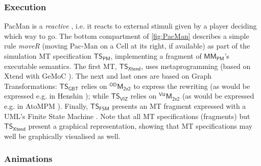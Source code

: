\subsubsection{Execution}
\label{sec:Examples:PacMan:Execution}

PacMan is a \emph{reactive} \DSL, i.e. it reacts to external stimuli given by a 
player deciding which way to go. 
The bottom compartment of \autoref{fig:PacMan} describes a simple rule 
\emph{\textsf{moveR}} (moving Pac-Man on a \textsf{Cell} at its right, if 
available) as part of the simulation MT specification $\mathsf{TS}_{\mathsf{PM}}$,
implementing a fragment of $\mathsf{MM}_{\mathsf{PM}}$'s executable semantics. 
The first MT, $\mathsf{TS}_{\mathsf{Xtend}}$, uses metaprogramming 
(based on Xtend with GeMoC \cite{Leroy-Bousse-etAl:2017}). The next and last ones
are based on Graph Transformations: $\mathsf{TS}_{\mathsf{GBT}}$ relies on 
$^{\mathsf{OD}}\mathsf{M}_{\mathsf{2x2}}$ to express the rewriting (as would be 
expressed e.g. in Henshin \cite{Bill-Gabmeyer-Kaufmann-Seidl:2014}); 
while $\mathsf{TS}_{\mathsf{VIZ}}$ relies on $^{\mathsf{Viz}}\mathsf{M}_{\mathsf{2x2}}$
(as would be expressed e.g. in AtoMPM \cite{J:SyrianiVangheluwe:2013}). 
Finally, $\mathsf{TS}_{\mathsf{FSM}}$ presents an MT fragment expressed with 
a UML's Finite State Machine \cite{B:Rumbaugh-Jacobson-Booch:2004}. 
Note that all MT specifications (fragments) but $\mathsf{TS}_{\mathsf{Xtend}}$ 
present a graphical representation, showing that MT specifications may well be 
graphically visualised as well.

\subsubsection{Animations}
\label{sec:Examples:PacMan:Animations}

